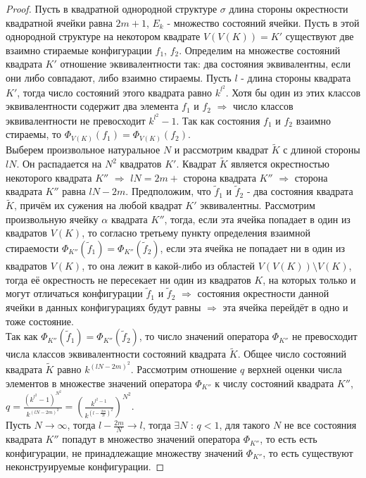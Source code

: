 \documentclass[a4paper, 12pt]{article}
\theoremstyle{definition}
\theoremstyle{plain}
\theoremstyle{remark}
\begin{document}
  \begin{proof}
    Пусть в квадратной однородной структуре $\sigma$ длина стороны окрестности квадратной ячейки равна $2m+1$, $E_k$ - множество состояний ячейки. Пусть в этой однородной структуре на некотором квадрате $V(V(K))=K'$ существуют две взаимно стираемые конфигурации $f_1$, $f_2$. Определим на множестве состояний квадрата $K'$ отношение эквивалентности так: два состояния эквивалентны, если они либо совпадают, либо взаимно стираемы. Пусть $l$ - длина стороны квадрата $K'$, тогда число состояний этого квадрата равно $k^{l^2}$. Хотя бы один из этих классов эквивалентности содержит два элемента $f_1$ и $f_2$ $\Longrightarrow$ число классов эквивалентности не превосходит $k^{l^2}-1$. Так как состояния $f_1$ и $f_2$ взаимно стираемы, то $\Phi_{V(K)}(f_1)=\Phi_{V(K)}(f_2)$.\\
    Выберем произвольное натуральное $N$ и рассмотрим квадрат $\tilde{K}$ с длиной стороны $lN$. Он распадается на $N^2$ квадратов $K'$. Квадрат $\tilde{K}$ является окрестностью некоторого квадрата $K''$ $\Longrightarrow$ $lN=2m+$ сторона квадрата $K''$ $\Longrightarrow$ сторона квадрата $K''$ равна $lN-2m$. Предположим, что $\tilde{f}_1$ и $\tilde{f}_2$ - два состояния квадрата $\tilde{K}$, причём их сужения на любой квадрат $K'$ эквивалентны. Рассмотрим произвольную ячейку $\alpha$ квадрата $K''$, тогда, если эта ячейка попадает в один из квадратов $V(K)$, то согласно третьему пункту определения взаимной стираемости $\Phi_{K''}(\tilde{f}_1)=\Phi_{K''}(\tilde{f}_2)$, если эта ячейка не попадает ни в один из квадратов $V(K)$, то она лежит в какой-либо из областей $V(V(K))\setminus  V(K)$, тогда её окрестность не пересекает ни один из квадратов $K$, на которых только и могут отличаться конфигурации $\tilde{f}_1$ и $\tilde{f}_2$ $\Longrightarrow$ состояния окрестности данной ячейки в данных конфигурациях будут равны $\Longrightarrow$ эта ячейка перейдёт в одно и тоже состояние.\\
    Так как $\Phi_{K''}(\tilde{f}_1)=\Phi_{K''}(\tilde{f}_2)$, то число значений оператора $\Phi_{K''}$ не превосходит числа классов эквивалентности состояний квадрата $\tilde{K}$. Общее число состояний квадрата $\tilde{K}$ равно $k^{(lN-2m)^2}$. Рассмотрим отношение $q$ верхней оценки числа элементов в множестве значений оператора $\Phi_{K''}$ к числу состояний квадрата $K''$, $q=\frac{(k^{l^2}-1)^{N^2}}{k^{(lN-2m)^2}}=(\frac{k^{l^2-1}}{k^{(l-\frac{2m}{N})^2}})^{N^2}$.\\
    Пусть $N\rightarrow\infty$, тогда $l-\frac{2m}{N}\rightarrow l$, тогда $\exists N$ : $q<1$, для такого $N$ не все состояния квадрата $K''$ попадут в множество значений оператора $\Phi_{K''}$, то есть есть конфигурации, не принадлежащие множеству значений $\Phi_{K''}$, то есть существуют неконструируемые конфигурации.
  \end{proof}
\end{document}
